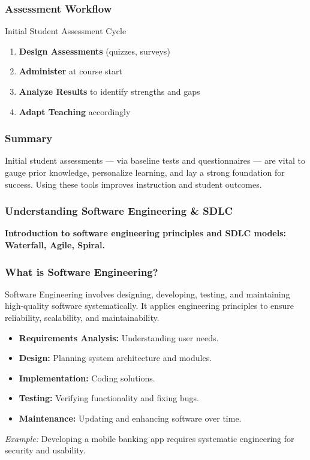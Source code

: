 \documentclass{beamer}
\begin{document}
\begin{frame}[fragile]
    \frametitle{Assessment Workflow}
    \begin{block}{Initial Student Assessment Cycle}
        \begin{enumerate}
            \item \textbf{Design Assessments} (quizzes, surveys)
            \item \textbf{Administer} at course start
            \item \textbf{Analyze Results} to identify strengths and gaps
            \item \textbf{Adapt Teaching} accordingly
        \end{enumerate}
    \end{block}
\end{frame}

\begin{frame}[fragile]
    \frametitle{Summary}
    Initial student assessments — via baseline tests and questionnaires — are vital to gauge prior knowledge, personalize learning, and lay a strong foundation for success. Using these tools improves instruction and student outcomes.
\end{frame}

\begin{frame}[fragile]
  \frametitle{Understanding Software Engineering \& SDLC}
  \textbf{Introduction to software engineering principles and SDLC models: Waterfall, Agile, Spiral.}
\end{frame}

\begin{frame}[fragile]
  \frametitle{What is Software Engineering?}
  Software Engineering involves designing, developing, testing, and maintaining high-quality software systematically. It applies engineering principles to ensure reliability, scalability, and maintainability.
  
  \begin{itemize}
    \item \textbf{Requirements Analysis:} Understanding user needs.
    \item \textbf{Design:} Planning system architecture and modules.
    \item \textbf{Implementation:} Coding solutions.
    \item \textbf{Testing:} Verifying functionality and fixing bugs.
    \item \textbf{Maintenance:} Updating and enhancing software over time.
  \end{itemize}
  
  \textit{Example:} Developing a mobile banking app requires systematic engineering for security and usability.
\end{frame}
\end{document}
